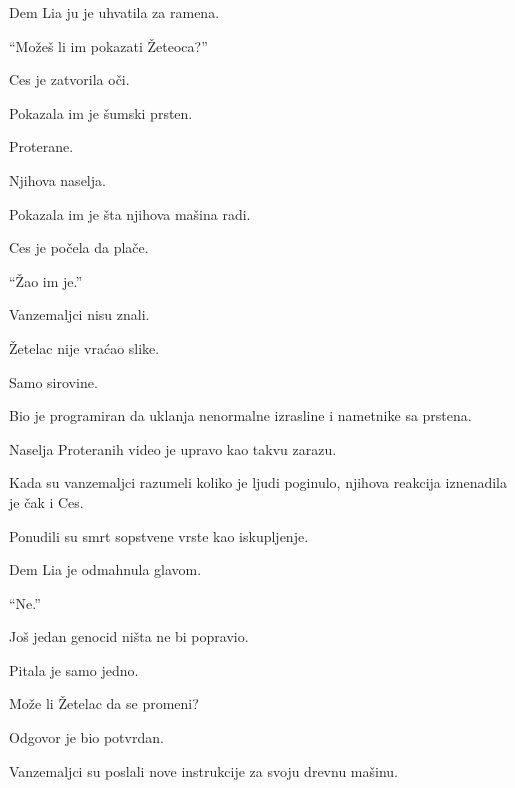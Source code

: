 Dem Lia ju je uhvatila za ramena.

``Možeš li im pokazati Žeteoca?''

\bigskip

Ces je zatvorila oči.

\bigskip

Pokazala im je šumski prsten.

Proterane.

Njihova naselja.

\bigskip

Pokazala im je šta njihova mašina radi.

\bigskip

Ces je počela da plače.

\bigskip

``Žao im je.''

\bigskip

Vanzemaljci nisu znali.

\bigskip

Žetelac nije vraćao slike.

Samo sirovine.

\bigskip

Bio je programiran da uklanja nenormalne izrasline i nametnike sa prstena.

\bigskip

Naselja Proteranih video je upravo kao takvu zarazu.

\bigskip

Kada su vanzemaljci razumeli koliko je ljudi poginulo, njihova reakcija iznenadila je čak i Ces.

\bigskip

Ponudili su smrt sopstvene vrste kao iskupljenje.

\bigskip

Dem Lia je odmahnula glavom.

``Ne.''

\bigskip

Još jedan genocid ništa ne bi popravio.

\bigskip

Pitala je samo jedno.

\bigskip

Može li Žetelac da se promeni?

\bigskip

Odgovor je bio potvrdan.

\bigskip

Vanzemaljci su poslali nove instrukcije za svoju drevnu mašinu.

\bigskip

